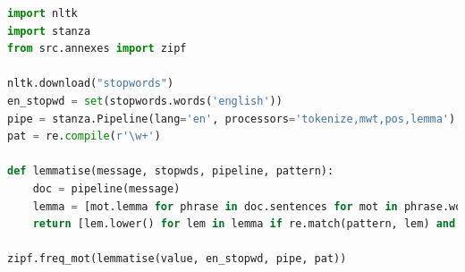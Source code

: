         \begin{lstlisting}[title=Pipeline de lemmatisation, language=python]
import nltk
import stanza
from src.annexes import zipf

nltk.download("stopwords")
en_stopwd = set(stopwords.words('english'))
pipe = stanza.Pipeline(lang='en', processors='tokenize,mwt,pos,lemma')
pat = re.compile(r'\w+')

def lemmatise(message, stopwds, pipeline, pattern):
    doc = pipeline(message)
    lemma = [mot.lemma for phrase in doc.sentences for mot in phrase.words]
    return [lem.lower() for lem in lemma if re.match(pattern, lem) and lem.lower() not in stopwds]

zipf.freq_mot(lemmatise(value, en_stopwd, pipe, pat))
			\end{lstlisting}

